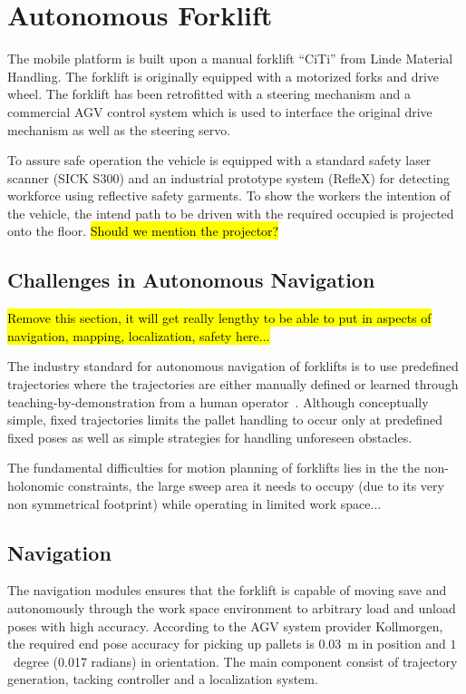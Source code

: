\section{Autonomous Forklift}
\label{sec:agv}
%

The mobile platform is built upon a manual forklift ``CiTi'' from
Linde Material Handling. The forklift is originally equipped with a
motorized forks and drive wheel. The forklift has been retrofitted
with a steering mechanism and a commercial AGV control system which is
used to interface the original drive mechanism as well as the steering
servo.

To assure safe operation the vehicle is equipped with a standard safety
laser scanner (SICK S300) and an industrial prototype system (RefleX) for
detecting workforce using reflective safety garments. To show the workers the intention of the vehicle, the intend path to be driven with the required occupied is projected onto the floor. \hl{Should we mention the projector?}

%
\subsection{Challenges in Autonomous Navigation}
\label{subsec:AGV_challenges}

\hl{Remove this section, it will get really lengthy to be able to put in aspects of navigation, mapping, localization, safety here...}

The industry standard for autonomous navigation of forklifts is to use predefined
trajectories where the trajectories are either
manually defined or learned through teaching-by-demonstration from a human
operator~\cite{HellstromRingdahl.VAS06,MarshallEtAl.JFR08}.
Although conceptually simple, fixed trajectories limits the pallet handling to occur only at predefined fixed poses as well as simple strategies for handling unforeseen obstacles.

The fundamental difficulties for motion planning of forklifts lies in the the non-holonomic constraints, the large sweep area it needs to occupy (due to its very non symmetrical footprint) while operating in limited work space...


\subsection{Navigation}
\label{subsec:navigation}
%

The navigation modules ensures that the forklift is capable of moving save and autonomously through the work space environment to arbitrary load and unload poses with high accuracy. According to the AGV system provider Kollmorgen, the required end pose accuracy
for picking up pallets is $0.03$~m in position and $1$~degree (0.017 radians) in
orientation. The main component consist of trajectory generation, tacking controller and a localization system. 
 
